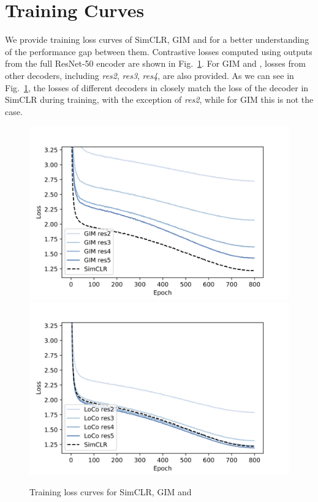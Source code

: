 \clearpage
\appendix
\section{Training Curves}
We provide training loss curves of SimCLR, GIM and \ours{} for a better understanding of the
performance gap between them. Contrastive losses computed using outputs from the full ResNet-50
encoder are shown in Fig.~\ref{fig:loss_curve}. For GIM and \ours{}, losses from other decoders,
including {\em res2}, {\em res3}, {\em res4}, are also provided. As we can see in
Fig.~\ref{fig:loss_curve}, the losses of different decoders in \ours{}  closely match the loss of
the decoder in SimCLR during training, with the exception of {\em res2}, while for GIM this is not
the case.

\iflatexml
    \begin{figure}
    \includegraphics[width=3\linewidth, trim={0.3cm 0 1cm 0}, clip]{figures/simclr_vs_gim.png}
    \includegraphics[width=3\linewidth, trim={0.3cm 0 1cm 0}, clip]{figures/simclr_vs_ours.png}
    \caption{Training loss curves for SimCLR, GIM and \ours{}}
    \label{fig:loss_curve}
    \end{figure}

